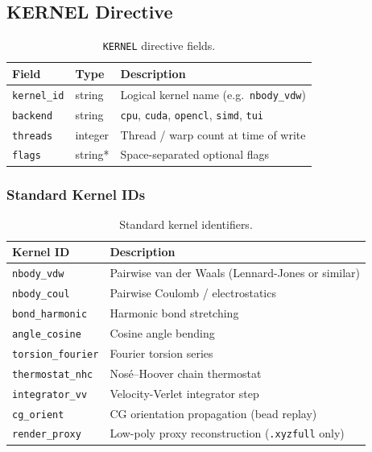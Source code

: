 \documentclass[12pt, a4paper, oneside]{article}
\begin{document}
\subsection{KERNEL Directive}

\begin{table}[htbp]
  \centering
  \caption{\texttt{KERNEL} directive fields.}
  \label{tab:kernel_fields}
  \begin{tabular}{lll}
    \toprule
    Field & Type & Description \\
    \midrule
    \texttt{kernel\_id} & string  & Logical kernel name (e.g.\ \texttt{nbody\_vdw}) \\
    \texttt{backend}    & string  & \texttt{cpu}, \texttt{cuda}, \texttt{opencl}, \texttt{simd}, \texttt{tui} \\
    \texttt{threads}    & integer & Thread / warp count at time of write \\
    \texttt{flags}      & string* & Space-separated optional flags \\
    \bottomrule
  \end{tabular}
\end{table}

\subsubsection{Standard Kernel IDs}

\begin{table}[htbp]
  \centering
  \caption{Standard kernel identifiers.}
  \label{tab:kernel_ids}
  \begin{tabular}{lp{9cm}}
    \toprule
    Kernel ID & Description \\
    \midrule
    \texttt{nbody\_vdw}      & Pairwise van der Waals (Lennard-Jones or similar) \\
    \texttt{nbody\_coul}     & Pairwise Coulomb / electrostatics \\
    \texttt{bond\_harmonic}  & Harmonic bond stretching \\
    \texttt{angle\_cosine}   & Cosine angle bending \\
    \texttt{torsion\_fourier}& Fourier torsion series \\
    \texttt{thermostat\_nhc} & Nos\'{e}--Hoover chain thermostat \\
    \texttt{integrator\_vv}  & Velocity-Verlet integrator step \\
    \texttt{cg\_orient}      & CG orientation propagation (bead replay) \\
    \texttt{render\_proxy}   & Low-poly proxy reconstruction (\texttt{.xyzfull} only) \\
    \bottomrule
  \end{tabular}
\end{table}
\end{document}
